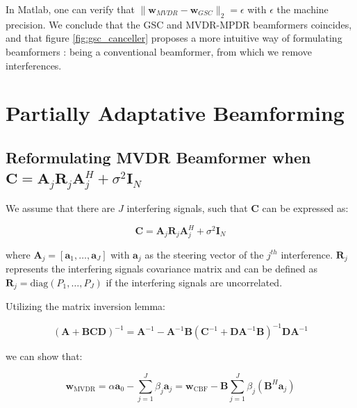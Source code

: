 \documentclass[12pt]{article}
\begin{document}
In Matlab, one can verify that $\|\mathbf{w}_{MVDR}-\mathbf{w}_{GSC}\|_ 2 = \epsilon$ with $\epsilon$ the machine precision. We conclude that the GSC and MVDR-MPDR beamformers coincides, and that figure \ref{fig:gsc_canceller} proposes a more intuitive way of formulating beamformers : being a conventional beamformer, from which we remove interferences.
\section{Partially Adaptative Beamforming}
\subsection{Reformulating MVDR Beamformer when $\mathbf{C} = \mathbf{A}_j \mathbf{R}_j \mathbf{A}_j^H + \sigma^2 \mathbf{I}_N$}

We assume that there are \( J \) interfering signals, such that \( \mathbf{C} \) can be expressed as:

\begin{equation}\label{eq:c}
\mathbf{C} = \mathbf{A}_j \mathbf{R}_j \mathbf{A}_j^H + \sigma^2 \mathbf{I}_N
\end{equation}

where \( \mathbf{A}_j = [\mathbf{a}_1, \ldots, \mathbf{a}_J] \) with \( \mathbf{a}_j \) as the steering vector of the \( j^{th} \) interference. \( \mathbf{R}_j \) represents the interfering signals covariance matrix and can be defined as \( \mathbf{R}_j = \text{diag}(P_1, \ldots, P_J) \) if the interfering signals are uncorrelated.

Utilizing the matrix inversion lemma:

\begin{equation}
(\mathbf{A} + \mathbf{BCD})^{-1} = \mathbf{A}^{-1} - \mathbf{A}^{-1} \mathbf{B} (\mathbf{C}^{-1} + \mathbf{D} \mathbf{A}^{-1} \mathbf{B})^{-1} \mathbf{D} \mathbf{A}^{-1}
\end{equation}

we can show that:

\begin{equation}
\mathbf{w}_{\text{MVDR}} = \alpha \mathbf{a}_0 - \sum_{j=1}^{J} \beta_j \mathbf{a}_j = \mathbf{w}_{\text{CBF}} - \mathbf{B} \sum_{j=1}^{J} \beta_j (\mathbf{B}^H \mathbf{a}_j)
\end{equation}
\end{document}
